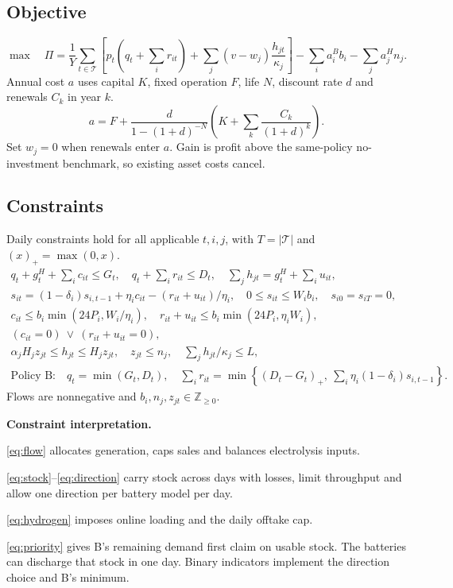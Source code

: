 \subsection{Objective}
\begin{equation}
\max\quad \Pi =
\frac{1}{Y}\sum_{t\in\mathcal T}
\left[p_t\left(q_t+\sum_i r_{it}\right)+
\sum_j (v-w_j)\frac{h_{jt}}{\kappa_j}\right]
-\sum_i a_i^B b_i-\sum_j a_j^H n_j .
\label{eq:profit}
\end{equation}
Annual cost \(a\) uses capital \(K\), fixed operation \(F\), life \(N\),
discount rate \(d\) and renewals \(C_k\) in year \(k\).
\begin{equation}
a=F+\frac{d}{1-(1+d)^{-N}}
\left(K+\sum_k\frac{C_k}{(1+d)^k}\right).
\label{eq:annualcost}
\end{equation}
Set \(w_j=0\) when renewals enter \(a\). Gain is profit above the
same-policy no-investment benchmark, so existing asset costs cancel.

\subsection{Constraints}
Daily constraints hold for all applicable \(t,i,j\), with \(T=|\mathcal T|\)
and \((x)_+=\max(0,x)\).
{\setlength{\jot}{3pt}
\begin{gather}
 q_t+g_t^H+\sum_i c_{it}\le G_t,\quad
 q_t+\sum_i r_{it}\le D_t,\quad
 \sum_j h_{jt}=g_t^H+\sum_i u_{it}, \label{eq:flow}\\
 s_{it}=(1-\delta_i)s_{i,t-1}+\eta_i c_{it}-(r_{it}+u_{it})/\eta_i,
 \quad 0\le s_{it}\le W_i b_i,\quad s_{i0}=s_{iT}=0, \label{eq:stock}\\
 c_{it}\le b_i\min(24P_i,W_i/\eta_i),\quad
 r_{it}+u_{it}\le b_i\min(24P_i,\eta_i W_i), \label{eq:window}\\
 (c_{it}=0)\ \lor\ (r_{it}+u_{it}=0), \label{eq:direction}\\
 \alpha_j H_j z_{jt}\le h_{jt}\le H_j z_{jt},\quad
 z_{jt}\le n_j,\quad \sum_j h_{jt}/\kappa_j\le L, \label{eq:hydrogen}\\
 \text{Policy B:}\quad q_t=\min(G_t,D_t), \quad
 \sum_i r_{it}=\min\!\left\{(D_t-G_t)_+,\
                   \sum_i\eta_i(1-\delta_i)s_{i,t-1}\right\}. \label{eq:priority}
\end{gather}}
Flows are nonnegative and \(b_i,n_j,z_{jt}\in\mathbb Z_{\ge0}\).

{\setlength{\parskip}{0pt}
\noindent\textbf{Constraint interpretation.}\par
\noindent\eqref{eq:flow} allocates generation, caps sales and balances electrolysis inputs.\par
\noindent\eqref{eq:stock}--\eqref{eq:direction} carry stock across days with losses, limit
throughput and allow one direction per battery model per day.\par
\noindent\eqref{eq:hydrogen} imposes online loading and the daily offtake cap.\par
\noindent\eqref{eq:priority} gives B's remaining demand first claim on usable stock.
The batteries can discharge that stock in one day. Binary indicators
implement the direction choice and B's minimum.\par}

